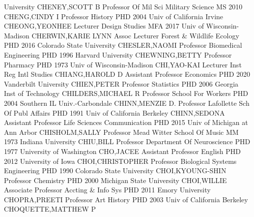 \documentclass[
]{article}
\begin{document}
University \textbar CHENEY,SCOTT B \textbar Professor Of Mil Sci
\textbar Military Science \textbar{}  \textbar MS 2010
\textbar CHENG,CINDY I \textbar Professor \textbar History \textbar{}
 \textbar PHD 2004 Univ of California Irvine
\textbar CHEONG,YEONHEE \textbar Lecturer \textbar Design Studies
\textbar{}  \textbar MFA 2017 Univ of Wisconsin-Madison
\textbar CHERWIN,KARIE LYNN \textbar Assoc Lecturer \textbar Forest \&
Wildlife Ecology \textbar{}  \textbar PHD 2016 Colorado State
University \textbar CHESLER,NAOMI \textbar Professor \textbar Biomedical
Engineering \textbar{}  \textbar PHD 1996 Harvard University
\textbar CHEWNING,BETTY \textbar Professor \textbar Pharmacy \textbar{}
 \textbar PHD 1973 Univ of Wisconsin-Madison
\textbar CHI,YAO-KAI \textbar Lecturer \textbar Inst Reg Intl Studies
\textbar{}  \textbar CHIANG,HAROLD D \textbar Assistant
Professor \textbar Economics \textbar PHD 2020 Vanderbilt University
\textbar{}  \textbar CHIEN,PETER \textbar Professor
\textbar Statistics \textbar PHD 2006 Georgia Inst of Technology
\textbar{}  \textbar CHILDERS,MICHAEL R \textbar Professor
\textbar School For Workers \textbar PHD 2004 Southern IL
Univ.-Carbondale \textbar{}  \textbar CHINN,MENZIE D.
\textbar Professor \textbar Lafollette Sch Of Publ Affairs \textbar PHD
1991 Univ of California Berkeley \textbar{} 
\textbar CHINN,SEDONA \textbar Assistant Professor \textbar Life
Sciences Communication \textbar PHD 2015 Univ of Michigan at Ann Arbor
\textbar{}  \textbar CHISHOLM,SALLY \textbar Professor
\textbar Mead Witter School Of Music \textbar MM 1973 Indiana University
\textbar{}  \textbar CHIU,BILL \textbar Professor
\textbar Department Of Neuroscience \textbar PHD 1977 University of
Washington \textbar{}  \textbar CHO,JACEE \textbar Assistant
Professor \textbar English \textbar PHD 2012 University of Iowa
\textbar{}  \textbar CHOI,CHRISTOPHER \textbar Professor
\textbar Biological Systems Engineering \textbar PHD 1990 Colorado State
University \textbar{}  \textbar CHOI,KYOUNG-SHIN
\textbar Professor \textbar Chemistry \textbar PHD 2000 Michigan State
University \textbar{}  \textbar CHOI,WILLIE
\textbar Associate Professor \textbar Accting \& Info Sys \textbar PHD
2011 Emory University \textbar{}  \textbar CHOPRA,PREETI
\textbar Professor \textbar Art History \textbar PHD 2003 Univ of
California Berkeley \textbar{}  \textbar CHOQUETTE,MATTHEW P
\end{document}
